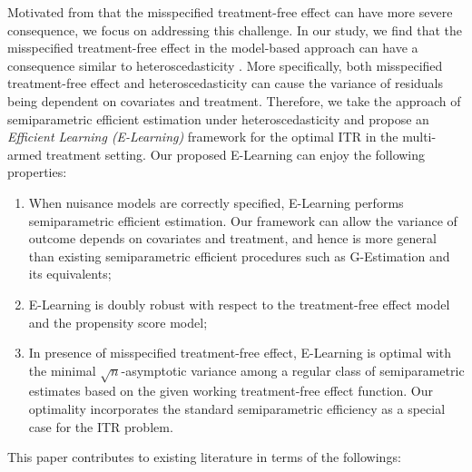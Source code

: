 \documentclass[11pt]{article}
\theoremstyle{definition}
\theoremstyle{remark}
\begin{document}
Motivated from \citet{kang2007demystifying} that the misspecified treatment-free effect can have more severe consequence, we focus on addressing this challenge. In our study, we find that the misspecified treatment-free effect in the model-based approach can have a consequence similar to heteroscedasticity \citep{carroll1982adapting}. More specifically, both misspecified treatment-free effect and heteroscedasticity can cause the variance of residuals being dependent on covariates and treatment. Therefore, we take the approach of semiparametric efficient estimation under heteroscedasticity \citep{ma2006efficient} and propose an \textit{Efficient Learning (E-Learning)} framework for the optimal ITR in the multi-armed treatment setting. Our proposed E-Learning can enjoy the following properties: 
\begin{enumerate}[leftmargin=*]
	\item When nuisance models are correctly specified, E-Learning performs semiparametric efficient estimation. Our framework can allow the variance of outcome depends on covariates and treatment, and hence is more general than existing semiparametric efficient procedures such as G-Estimation and its equivalents; 
	
	\item E-Learning is doubly robust with respect to the treatment-free effect model and the propensity score model; 
	
	\item In presence of misspecified treatment-free effect, E-Learning is optimal with the minimal $ \sqrt{n} $-asymptotic variance among a regular class of semiparametric estimates based on the given working treatment-free effect function. Our optimality incorporates the standard semiparametric efficiency \citep{tsiatis2007semiparametric} as a special case for the ITR problem.
\end{enumerate}
This paper contributes to existing literature in terms of the followings: 
\end{document}
